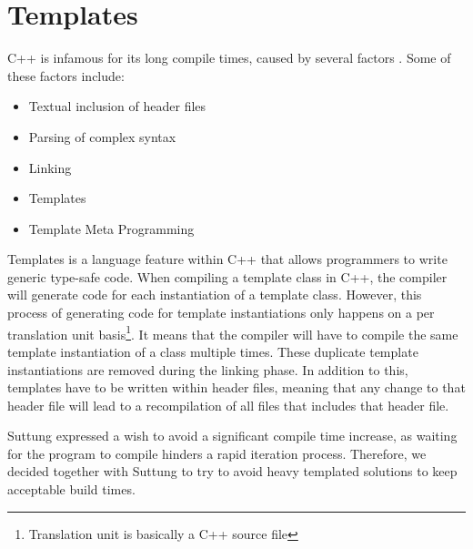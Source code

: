 \section{Templates}
\label{sec:requirements_templates}
C++ is infamous for its long compile times, caused by several factors
\cite{stack_overflow_why_does_cpp_compilation_take_so_long}.
Some of these factors include:
\begin{itemize}
    \item
    Textual inclusion of header files

    \item
    Parsing of complex syntax

    \item
    Linking

    \item
    Templates

    \item
    Template Meta Programming
\end{itemize}

Templates is a language feature within C++ that allows programmers to write generic type-safe code.
When compiling a template class in C++, the compiler will generate code for each instantiation of a template class.
However, this process of generating code for template instantiations only happens on a per translation unit basis\footnote{Translation unit is basically a C++ source file}.
It means that the compiler will have to compile the same template instantiation of a class multiple times.
These duplicate template instantiations are removed during the linking phase.
In addition to this, templates have to be written within header files,
meaning that any change to that header file will lead to a recompilation of all files that includes that header file\cite{dr_dobbs_cpp_compilation_speed}.

Suttung expressed a wish to avoid a significant compile time increase, as waiting for the program to compile hinders a rapid iteration process.
Therefore, we decided together with Suttung to try to avoid heavy templated solutions to keep acceptable build times.

